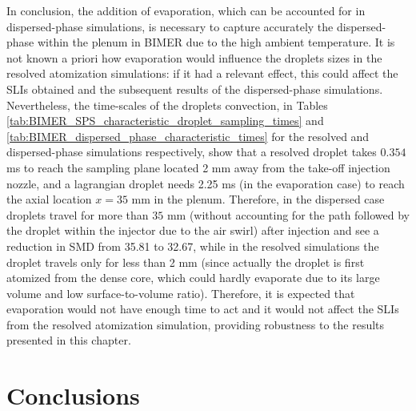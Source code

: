 In conclusion, the addition of evaporation, which can be accounted for in dispersed-phase simulations, is necessary to capture accurately the dispersed-phase within the plenum in BIMER due to the high ambient temperature. It is not known a priori how evaporation would influence the droplets sizes in the resolved atomization simulations: if it had a relevant effect, this could affect the SLIs obtained and the subsequent results of the dispersed-phase simulations. Nevertheless, the time-scales of the droplets convection, in Tables \ref{tab:BIMER_SPS_characteristic_droplet_sampling_times} and \ref{tab:BIMER_dispersed_phase_characteristic_times} for the resolved and dispersed-phase simulations respectively, show that a resolved droplet takes $0.354$ ms to reach the sampling plane located 2 mm  away from the take-off injection nozzle, and a lagrangian droplet needs 2.25 ms (in the evaporation case) to reach the axial location $x = 35$ mm in the plenum. Therefore, in the dispersed case droplets travel for more than $35$ mm (without accounting for the path followed by the droplet within the injector due to the air swirl) after injection and see a reduction in SMD from 35.81 to 32.67, while in the resolved simulations the droplet travels only for less than 2 mm (since actually the droplet is first atomized from the dense core, which could hardly evaporate due to its large volume and low surface-to-volume ratio). Therefore, it is expected that evaporation would not have enough time to act and it would not affect the SLIs from the resolved atomization simulation, providing robustness to the results presented in this chapter.

%


\section{Conclusions}


